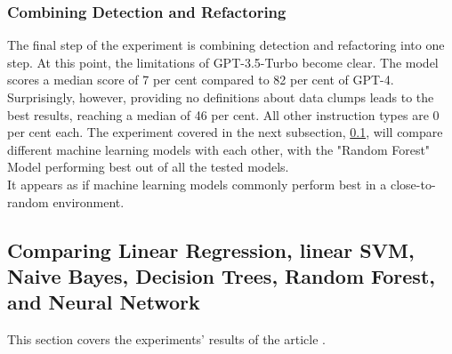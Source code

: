 \subsubsection{Combining Detection and Refactoring}
The final step of the experiment is combining detection and refactoring into one step. At this point, the limitations of GPT-3.5-Turbo become clear. The model scores a median score of 7 per cent compared to 82 per cent of GPT-4.
Surprisingly, however, providing no definitions about data clumps leads to the best results, reaching a median of 46 per cent.
All other instruction types are 0 per cent each.
The experiment covered in the next subsection, \ref{comparingAlgorithms}, will compare different machine learning models with each other, with the "Random Forest" Model performing best out of all the tested models.\\
It appears as if machine learning models commonly perform best in a close-to-random environment.
\subsection{Comparing Linear Regression, linear SVM, Naive Bayes, Decision Trees, Random Forest, and Neural Network} \label{comparingAlgorithms}
This section covers the experiments' results of the article \cite[The effectiveness of supervised machine learning algorithms in predicting software refactoring]{aniche2020effectiveness}.
